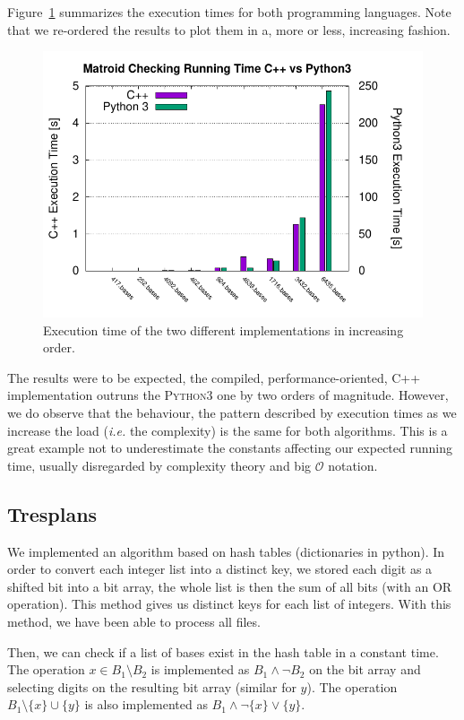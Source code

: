 \documentclass[11pt]{amsart}
\begin{document}
Figure~\ref{fig:team-bearland-times} summarizes the execution times for both programming languages.
Note that we re-ordered the results to plot them in a, more or less, increasing fashion. 
\begin{figure}[h!]
    \centering
    \includegraphics[width=.7\textwidth]{./team-berland/exec_time.pdf}
    \caption{Execution time of the two different implementations in increasing order.\label{fig:team-bearland-times}}
\end{figure}
The results were to be expected, the compiled, performance-oriented, \textsc{C++} implementation outruns the \textsc{Python3} one by two orders of magnitude.
However, we do observe that the behaviour, the pattern described by execution times as we increase the load (\textit{i.e.} the complexity) is the same for both algorithms.
This is a great example not to underestimate the constants affecting our expected running time, usually disregarded by complexity theory and big $\mathcal{O}$ notation.

\subsection{Tresplans}

We implemented an algorithm based on hash tables (dictionaries in python).
In order to convert each integer list into a distinct key,
we stored each digit as a shifted bit into a bit array,
the whole list is then the sum of all bits (with an OR operation).
This method gives us distinct keys for each list of integers.
With this method,
we have been able to process all files.

Then, we can check if a list of bases exist in the hash table in a constant time.
The operation
\(x \in B_1 \setminus B_2\)
is implemented as
\(B_1 \land \neg B_2\)
on the bit array and selecting digits on the resulting bit array
(similar for \(y\)).
The operation
\(B_1 \setminus \{x\} \cup \{y\}\)
is also implemented as
\(B_1 \land \neg \{x\} \lor \{y\}\).
\end{document}
